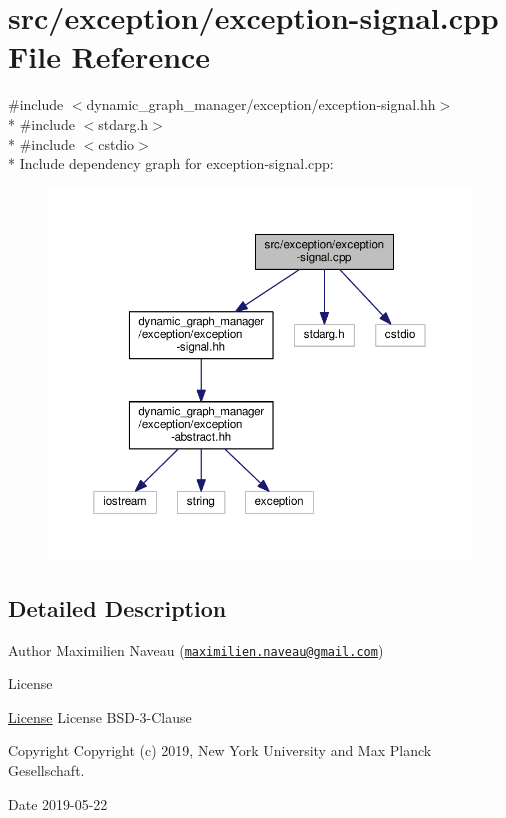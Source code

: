 \hypertarget{exception-signal_8cpp}{}\section{src/exception/exception-\/signal.cpp File Reference}
\label{exception-signal_8cpp}
{\ttfamily \#include $<$dynamic\+\_\+graph\+\_\+manager/exception/exception-\/signal.\+hh$>$}\\*
{\ttfamily \#include $<$stdarg.\+h$>$}\\*
{\ttfamily \#include $<$cstdio$>$}\\*
Include dependency graph for exception-\/signal.cpp\+:
\nopagebreak
\begin{figure}[H]
\begin{center}
\leavevmode
\includegraphics[width=350pt]{exception-signal_8cpp__incl}
\end{center}
\end{figure}


\subsection{Detailed Description}
\begin{DoxyAuthor}{Author}
Maximilien Naveau (\href{mailto:maximilien.naveau@gmail.com}{\tt maximilien.\+naveau@gmail.\+com}) 
\end{DoxyAuthor}
\begin{DoxyRefDesc}{License}
\item[\hyperlink{license__license000050}{License}]License B\+S\+D-\/3-\/\+Clause \end{DoxyRefDesc}
\begin{DoxyCopyright}{Copyright}
Copyright (c) 2019, New York University and Max Planck Gesellschaft. 
\end{DoxyCopyright}
\begin{DoxyDate}{Date}
2019-\/05-\/22 
\end{DoxyDate}
